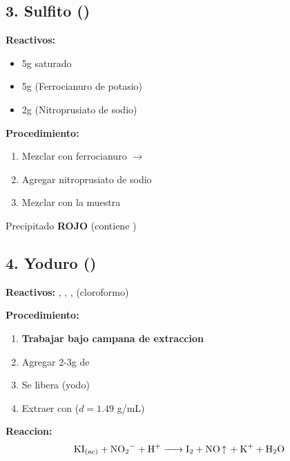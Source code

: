 \documentclass[11pt,a4paper]{article}
\begin{document}
\subsection{3. Sulfito ()}

\textbf{Reactivos:}
\begin{itemize}[leftmargin=*]
    \item 5g  saturado
    \item 5g  (Ferrocianuro de potasio)
    \item 2g  (Nitroprusiato de sodio)
\end{itemize}

\textbf{Procedimiento:}
\begin{enumerate}[leftmargin=*]
    \item Mezclar  con ferrocianuro $\rightarrow$ 
    \item Agregar nitroprusiato de sodio
    \item Mezclar con la muestra
\end{enumerate}

\begin{resultado}
Precipitado \textbf{\textcolor{rojo}{ROJO}} (contiene )
\end{resultado}

\subsection{4. Yoduro ()}

\textbf{Reactivos:} , , ,  (cloroformo)

\textbf{Procedimiento:}
\begin{enumerate}[leftmargin=*]
    \item \textbf{Trabajar bajo campana de extraccion}
    \item Agregar 2-3g de 
    \item Se libera  (yodo)
    \item Extraer con  ($d = 1.49$ g/mL)
\end{enumerate}

\begin{reaccionbox}
\textbf{Reaccion:}
\begin{equation*}
\ce{KI_{(ac)} + NO2^- + H^+ -> I2 + NO ^  + K^+ + H2O}
\end{equation*}
\end{reaccionbox}
\end{document}

